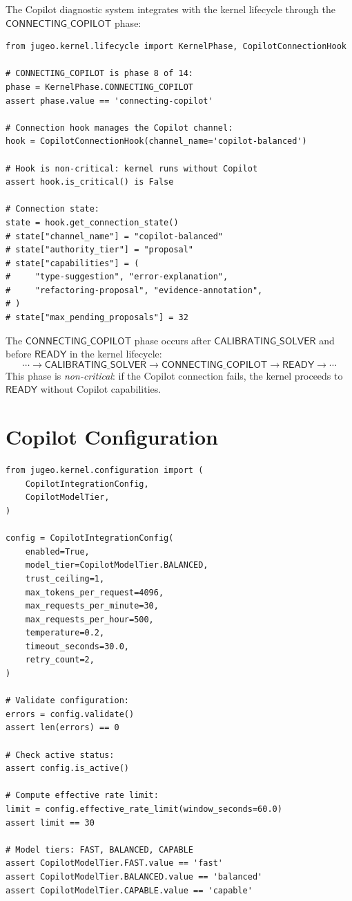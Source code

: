 \documentclass[11pt]{article}
\begin{document}
The Copilot diagnostic system integrates with the kernel lifecycle through
the $\mathsf{CONNECTING\_COPILOT}$ phase:

\begin{lstlisting}[style=jugeo-python]
from jugeo.kernel.lifecycle import KernelPhase, CopilotConnectionHook

# CONNECTING_COPILOT is phase 8 of 14:
phase = KernelPhase.CONNECTING_COPILOT
assert phase.value == 'connecting-copilot'

# Connection hook manages the Copilot channel:
hook = CopilotConnectionHook(channel_name='copilot-balanced')

# Hook is non-critical: kernel runs without Copilot
assert hook.is_critical() is False

# Connection state:
state = hook.get_connection_state()
# state["channel_name"] = "copilot-balanced"
# state["authority_tier"] = "proposal"
# state["capabilities"] = (
#     "type-suggestion", "error-explanation",
#     "refactoring-proposal", "evidence-annotation",
# )
# state["max_pending_proposals"] = 32
\end{lstlisting}

\begin{definition}\label{def:phase}
The $\mathsf{CONNECTING\_COPILOT}$ phase occurs after
$\mathsf{CALIBRATING\_SOLVER}$ and before $\mathsf{READY}$ in the kernel
lifecycle:
\[
  \cdots \to \mathsf{CALIBRATING\_SOLVER} \to
  \mathsf{CONNECTING\_COPILOT} \to \mathsf{READY} \to \cdots
\]
This phase is \emph{non-critical}: if the Copilot connection fails, the
kernel proceeds to $\mathsf{READY}$ without Copilot capabilities.
\end{definition}

\section{Copilot Configuration}\label{sec:config}

\begin{lstlisting}[style=jugeo-python]
from jugeo.kernel.configuration import (
    CopilotIntegrationConfig,
    CopilotModelTier,
)

config = CopilotIntegrationConfig(
    enabled=True,
    model_tier=CopilotModelTier.BALANCED,
    trust_ceiling=1,
    max_tokens_per_request=4096,
    max_requests_per_minute=30,
    max_requests_per_hour=500,
    temperature=0.2,
    timeout_seconds=30.0,
    retry_count=2,
)

# Validate configuration:
errors = config.validate()
assert len(errors) == 0

# Check active status:
assert config.is_active()

# Compute effective rate limit:
limit = config.effective_rate_limit(window_seconds=60.0)
assert limit == 30

# Model tiers: FAST, BALANCED, CAPABLE
assert CopilotModelTier.FAST.value == 'fast'
assert CopilotModelTier.BALANCED.value == 'balanced'
assert CopilotModelTier.CAPABLE.value == 'capable'
\end{lstlisting}
\end{document}
